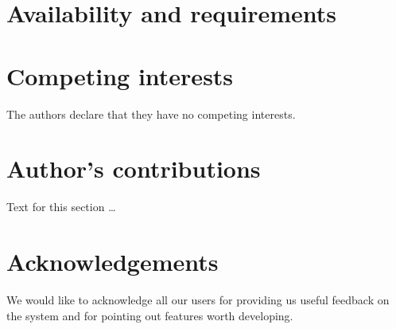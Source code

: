 \documentclass{bmcart}
\begin{document}
\section*{Availability and requirements}


\begin{backmatter}

\section*{Competing interests}
  The authors declare that they have no competing interests.

\section*{Author's contributions}
    Text for this section \ldots

\section*{Acknowledgements}
We would like to acknowledge all our users for providing us useful feedback on
the system and for pointing out features worth developing.




\end{backmatter}
\end{document}
